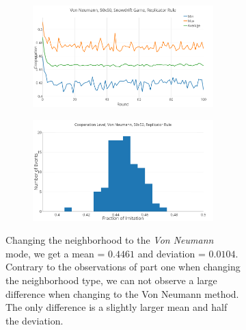 \documentclass[a4paper, 11pt]{article}
\begin{document}
\begin{figure}[H]
\begin{subfigure}{.55\textwidth}
	\begin{subfigure}{1\textwidth}
		\includegraphics[width=1\linewidth]{SDVonNeumann50x50}
	\end{subfigure}

	\begin{subfigure}{1\textwidth}
		\includegraphics[width=1\linewidth]{SDVonNeumann50x50HG}
	\end{subfigure}
\end{subfigure}%
\begin{subfigure}{.45\textwidth}
	Changing the neighborhood to the \textit{Von Neumann} mode, we get a mean = $0.4461$ and deviation = $0.0104$. Contrary to the observations of part one when changing the neighborhood type, we can not observe a large difference when changing to the Von Neumann method. The only difference is a slightly larger mean and half the deviation.
\end{subfigure}

\end{figure}
\end{document}
